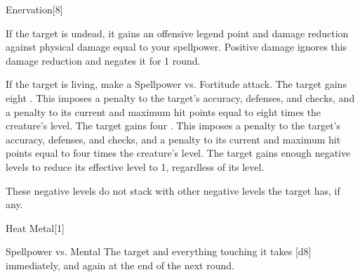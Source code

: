 \begin{spellfooter}
\begin{spellsection}[Greater]{Enervation}[8]
    \begin{spellheader}
    \end{spellheader}
    \begin{spellcontent}
        \begin{spelltargetinginfo}
        \end{spelltargetinginfo}
        \begin{spelleffects}
            \spelleffect If the target is undead, it gains an offensive legend point and damage reduction against physical damage equal to your spellpower. Positive damage ignores this damage reduction and negates it for 1 round.
            \begin{spellattacktriggered}{If the target is living, make a Spellpower vs. Fortitude attack.}
                \spellsuccess The target gains eight . This imposes a  penalty to the target's accuracy, defenses, and checks, and a penalty to its current and maximum hit points equal to eight times the creature's level.
                \spellfailure The target gains four . This imposes a  penalty to the target's accuracy, defenses, and checks, and a penalty to its current and maximum hit points equal to four times the creature's level.
                \spellcritical The target gains enough negative levels to reduce its effective level to 1, regardless of its level.
            \end{spellattacktriggered}
        \end{spelleffects}
    \end{spellcontent}
    \begin{spellfooter}
        \spellnotes These negative levels do not stack with other negative levels the target has, if any.
        \miscastrandom
    \end{spellfooter}
\end{spellsection}

\begin{spellsection}{Heat Metal}[1]
    \begin{spellheader}
    \end{spellheader}
    \begin{spellcontent}
        \begin{spelltargetinginfo}
        \end{spelltargetinginfo}
        \begin{spelleffects}
            \begin{spellattack}{Spellpower vs. Mental}
                \spellsuccess The target and everything touching it takes [d8] immediately, and again at the end of the next round.


\end{spellattack}
\end{spelleffects}
\end{spellcontent}
\end{spellsection}
\end{spellfooter}
